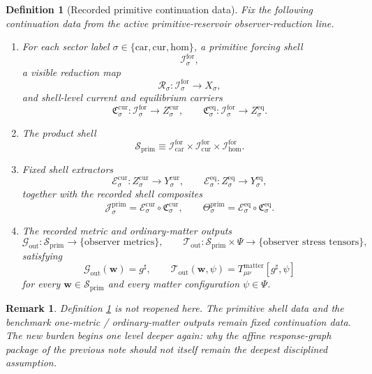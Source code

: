 \documentclass[11pt]{article}
\newcommand{\CompletedMetric}{g^{\sharp}}
\newcommand{\Car}{\mathrm{car}}
\newcommand{\Cur}{\mathrm{cur}}
\newcommand{\Hom}{\mathrm{hom}}
\newcommand{\ForSpace}[1]{\mathcal I_{#1}^{\mathrm{for}}}
\newcommand{\PrimShell}{\mathcal S_{\mathrm{prim}}}
\newcommand{\Reduction}[1]{\mathcal R_{#1}}
\newcommand{\CurrentCarrier}[1]{\mathfrak C_{#1}^{\mathrm{cur}}}
\newcommand{\EqCarrier}[1]{\mathfrak C_{#1}^{\mathrm{eq}}}
\newcommand{\CurrentExtract}[1]{\mathscr E_{#1}^{\mathrm{cur}}}
\newcommand{\EqExtract}[1]{\mathscr E_{#1}^{\mathrm{eq}}}
\newcommand{\PrimCurrent}[1]{\mathcal J_{#1}^{\mathrm{prim}}}
\newcommand{\PrimTheta}[1]{\Theta_{#1}^{\mathrm{prim}}}
\newcommand{\MetricOut}{\mathscr G_{\mathrm{out}}}
\newcommand{\MatterOut}{\mathscr T_{\mathrm{out}}}
\newtheorem{definition}{Definition}
\newtheorem{remark}{Remark}
\begin{document}
\begin{definition}[Recorded primitive continuation data]
\label{def:fixed}
Fix the following continuation data from the active primitive-reservoir observer-reduction line.
\begin{enumerate}
    \item For each sector label \(\sigma\in\{\Car,\Cur,\Hom\}\), a primitive forcing shell
    \[
    \ForSpace{\sigma},
    \]
    a visible reduction map
    \[
    \Reduction{\sigma}:\ForSpace{\sigma}\to X_{\sigma},
    \]
    and shell-level current and equilibrium carriers
    \[
    \CurrentCarrier{\sigma}:\ForSpace{\sigma}\to Z_{\sigma}^{\mathrm{cur}},
    \qquad
    \EqCarrier{\sigma}:\ForSpace{\sigma}\to Z_{\sigma}^{\mathrm{eq}}.
    \]
    \item The product shell
    \[
    \PrimShell
    \equiv
    \ForSpace{\Car}\times \ForSpace{\Cur}\times \ForSpace{\Hom}.
    \]
    \item Fixed shell extractors
    \[
    \CurrentExtract{\sigma}:Z_{\sigma}^{\mathrm{cur}}\to Y_{\sigma}^{\mathrm{cur}},
    \qquad
    \EqExtract{\sigma}:Z_{\sigma}^{\mathrm{eq}}\to Y_{\sigma}^{\mathrm{eq}},
    \]
    together with the recorded shell composites
    \begin{equation}
    \PrimCurrent{\sigma}
    =
    \CurrentExtract{\sigma}\circ \CurrentCarrier{\sigma},
    \qquad
    \PrimTheta{\sigma}
    =
    \EqExtract{\sigma}\circ \EqCarrier{\sigma}.
    \label{eq:primcomposites}
    \end{equation}
    \item The recorded metric and ordinary-matter outputs
    \[
    \MetricOut:\PrimShell\to\{\text{observer metrics}\},
    \qquad
    \MatterOut:\PrimShell\times\Psi\to\{\text{observer stress tensors}\},
    \]
    satisfying
    \begin{equation}
    \MetricOut(\mathbf w)=\CompletedMetric,
    \qquad
    \MatterOut(\mathbf w,\psi)
    =
    T_{\mu\nu}^{\mathrm{matter}}[\CompletedMetric,\psi]
    \label{eq:fixedoutputs}
    \end{equation}
    for every \(\mathbf w\in\PrimShell\) and every matter configuration \(\psi\in\Psi\).
\end{enumerate}
\end{definition}

\begin{remark}
Definition \ref{def:fixed} is not reopened here. The primitive shell data and the benchmark one-metric / ordinary-matter outputs remain fixed continuation data. The new burden begins one level deeper again: why the affine response-graph package of the previous note should not itself remain the deepest disciplined assumption.
\end{remark}
\end{document}
